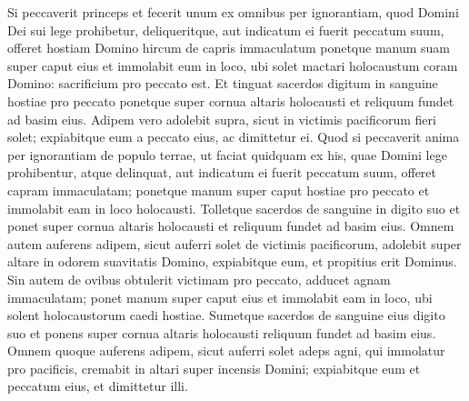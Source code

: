 \begin{biblechapter}
\begin{biblechapter}
\begin{biblechapter}
\begin{biblechapter}
 \verse Si peccaverit princeps et fecerit unum ex omnibus per ignorantiam, quod Domini Dei sui lege prohibetur, deliqueritque, 
\verse aut indicatum ei fuerit peccatum suum, offeret hostiam Domino hircum de capris immaculatum 
\verse ponetque manum suam super caput eius et immolabit eum in loco, ubi solet mactari holocaustum coram Domino: sacrificium pro peccato est. 
\verse Et tinguat sacerdos digitum in sanguine hostiae pro peccato ponetque super cornua altaris holocausti et reliquum fundet ad basim eius. 
\verse Adipem vero adolebit supra, sicut in victimis pacificorum fieri solet; expiabitque eum a peccato eius, ac dimittetur ei.
 \verse Quod si peccaverit anima per ignorantiam de populo terrae, ut faciat quidquam ex his, quae Domini lege prohibentur, atque delinquat, 
\verse aut indicatum ei fuerit peccatum suum, offeret capram immaculatam; 
\verse ponetque manum super caput hostiae pro peccato et immolabit eam in loco holocausti. 
\verse Tolletque sacerdos de sanguine in digito suo et ponet super cornua altaris holocausti et reliquum fundet ad basim eius. 
\verse Omnem autem auferens adipem, sicut auferri solet de victimis pacificorum, adolebit super altare in odorem suavitatis Domino, expiabitque eum, et propitius erit Dominus.
 \verse Sin autem de ovibus obtulerit victimam pro peccato, adducet agnam immaculatam; 
\verse ponet manum super caput eius et immolabit eam in loco, ubi solent holocaustorum caedi hostiae. 
\verse Sumetque sacerdos de sanguine eius digito suo et ponens super cornua altaris holocausti reliquum fundet ad basim eius. 
\verse Omnem quoque auferens adipem, sicut auferri solet adeps agni, qui immolatur pro pacificis, cremabit in altari super incensis Domini; expiabitque eum et peccatum eius, et dimittetur illi.
 

\end{biblechapter}
\end{biblechapter}
\end{biblechapter}
\end{biblechapter}
